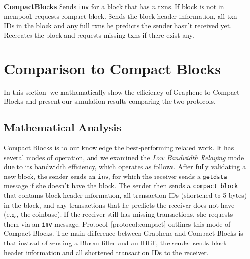{\begin{myprot}{\textbf{CompactBlocks}}
\label{protocol:compact}
\STATE \sender Sends {\tt inv} for a block that has $n$ txns.
\STATE \recvr If block is not in mempool, requests compact block.
\STATE \sender Sends the block header information, all txn IDs in the block and any full txns he predicts the sender hasn't received yet.
\STATE \recvr Recreates the block and requests missing txns if there exist any.
\end{myprot}}

\section{Comparison to Compact Blocks} 
In this section, we mathematically show the efficiency of Graphene to Compact Blocks and present our simulation results comparing the two protocols.

\subsection{Mathematical Analysis}
Compact Blocks\cite{Corallo:2016} is to our knowledge the best-performing related work. It has several modes of operation, and 
we examined the \textit{Low Bandwidth
  Relaying} mode due to its bandwidth efficiency, which operates as follows. 
After fully
validating a new block, the sender sends an {\tt inv}, for which the receiver sends a {\tt getdata} message if she
doesn't have the block. The sender then sends a {\tt compact block}
that contains block header information, all  transaction IDs (shortened to 5 bytes)
in the block, and any transactions that he predicts the receiver does
not have (e.g., the coinbase). If the receiver still has missing transactions, she requests
them via an {\tt inv} message. Protocol~\ref{protocol:compact} outlines
this  mode of Compact Blocks. The main difference between Graphene and Compact Blocks is that instead of
sending a Bloom filter and an IBLT, the sender sends block header
information and all shortened transaction IDs to the receiver. 

